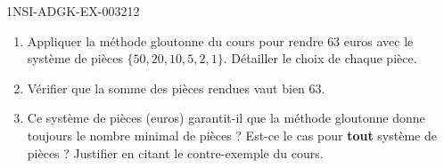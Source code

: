 \begin{exercice}{1NSI-ADGK-EX-003}{2}{12}
\begin{enumerate}
  \item Appliquer la méthode gloutonne du cours pour rendre $63$ euros avec le système de pièces $\{50, 20, 10, 5, 2, 1\}$. Détailler le choix de chaque pièce.
  \item Vérifier que la somme des pièces rendues vaut bien $63$.
  \item Ce système de pièces (euros) garantit-il que la méthode gloutonne donne toujours le nombre minimal de pièces ? Est-ce le cas pour \textbf{tout} système de pièces ? Justifier en citant le contre-exemple du cours.
\end{enumerate}
\end{exercice}
